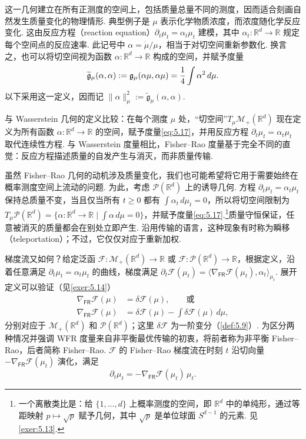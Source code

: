 这一几何建立在所有正测度的空间上，包括质量总量不同的测度，因而适合刻画自然发生质量变化的物理情形. 典型例子是 $\mu$ 表示化学物质浓度，而浓度随化学反应变化. 这由反应方程（reaction equation）$\partial_t\mu_t=\alpha_t\mu_t$ 建模，其中 $\alpha_t:\mathbb R^d\to\mathbb R$ 规定每个空间点的反应速率. 此记号中 $\alpha=\dot\mu/\mu$，相当于对切空间重新参数化. 换言之，也可以将切空间视为函数 $\alpha:\mathbb R^d\to\mathbb R$ 构成的空间，并赋予度量
\begin{equation}\label{eq:5.17}\index{Fisher–Rao@Fisher–Rao|hyperpage}
\widetilde{\mathfrak g}_\mu(\alpha,\alpha)
:=\mathfrak g_\mu(\alpha\mu,\alpha\mu)=\frac14\int\alpha^2\,d\mu.
\end{equation}
以下采用这一定义，因而记 $\|\alpha\|_\mu^2:=\widetilde{\mathfrak g}_\mu(\alpha,\alpha)$.

与 Wasserstein 几何的定义比较：在每个测度 $\mu$ 处，“切空间”$T_\mu\mathcal M_+(\mathbb R^d)$ 现在定义为所有函数 $\alpha:\mathbb R^d\to\mathbb R$ 的空间，赋予度量\eqref{eq:5.17}，并用反应方程 $\partial_t\mu_t=\alpha_t\mu_t$ 取代连续性方程. 与 Wasserstein 度量相比，Fisher--Rao 度量基于完全不同的直觉：反应方程描述质量的自发产生与消灭，而非质量传输.

虽然 Fisher--Rao 几何的动机涉及质量变化，我们也可能希望将它用于需要始终在概率测度空间上流动的问题. 为此，考虑 $\mathcal P(\mathbb R^d)$ 上的诱导几何. 方程 $\partial_t\mu_t=\alpha_t\mu_t$ 保持总质量不变，当且仅当所有 $t\geq0$ 都有 $\int\alpha_t\,d\mu_t=0$，所以将切空间限制为 $T_\mu\mathcal P(\mathbb R^d)=\{\alpha:\mathbb R^d\to\mathbb R\mid\int\alpha\,d\mu=0\}$，并赋予度量\eqref{eq:5.17}.\footnote{一个离散类比是：给 $\{1,\ldots,d\}$ 上概率测度的空间，即 $\mathbb R^d$ 中的单纯形，通过等距映射 $p\mapsto\sqrt p$ 赋予几何，其中 $\sqrt p$ 是单位球面 $S^{d-1}$ 的元素. 见\autoref{exer:5.13}.}质量守恒保证，任意被消灭的质量都会在别处立即产生. 沿用传输的语言，这种现象有时称为瞬移（teleportation）；不过，它仅仅对应于重新加权.

梯度流又如何？给定泛函 $\mathcal F:\mathcal M_+(\mathbb R^d)\to\mathbb R$ 或 $\mathcal F:\mathcal P(\mathbb R^d)\to\mathbb R$，根据定义，沿着任意满足 $\partial_t\mu_t=\alpha_t\mu_t$ 的曲线，梯度满足 $\partial_t\mathcal F(\mu_t)=\langle\nabla_{\mathsf{FR}}\mathcal F(\mu_t),\alpha_t\rangle_{\mu_t}$. 展开定义可以验证（见\autoref{exer:5.14}）
\begin{equation}\label{eq:5.18}
\begin{aligned}
\nabla_{\mathsf{FR}}\mathcal F(\mu)&=\delta\mathcal F(\mu),\qquad\text{或}\\
\nabla_{\mathsf{FR}}\mathcal F(\mu)&=\delta\mathcal F(\mu)-\int\delta\mathcal F(\mu)\,d\mu,
\end{aligned}
\end{equation}
分别对应于 $\mathcal M_+(\mathbb R^d)$ 和 $\mathcal P(\mathbb R^d)$；这里 $\delta\mathcal F$ 为一阶变分（\autoref{def:5.9}）. 为区分两种情况并强调 WFR 度量来自非平衡最优传输的初衷，将前者称为非平衡 Fisher--Rao，后者简称 Fisher--Rao. $\mathcal F$ 的 Fisher--Rao 梯度流在时刻 $t$ 沿切向量 $-\nabla_{\mathsf{FR}}\mathcal F(\mu_t)$ 演化，满足
\begin{equation}\label{eq:5.19}
\partial_t\mu_t=-\nabla_{\mathsf{FR}}\mathcal F(\mu_t)\,\mu_t.
\end{equation}

